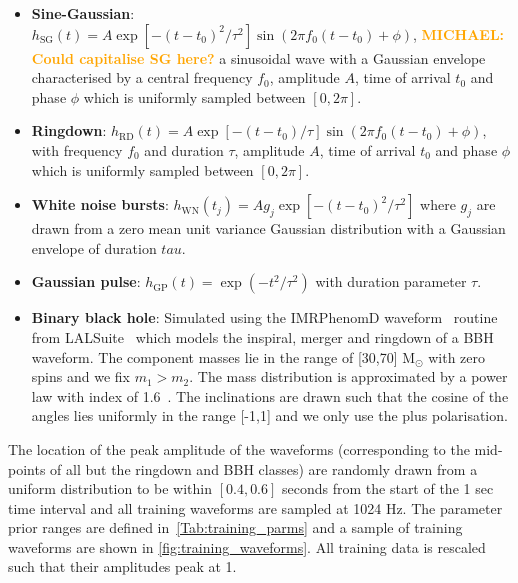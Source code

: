 \documentclass[12pt]{iopart}
\newcommand{\michael}[1]{\textbf{\textcolor{orange}{MICHAEL: #1}}}
\begin{document}
%
\begin{itemize}
%
\item {\bf Sine-Gaussian}: $h_{\text{SG}}(t) = A \exp\left[ - (t-t_{0})^2 /
\tau^2 \right] \sin (2 \pi f_0 (t-t_0) + \phi)$, \michael{Could capitalise SG here?} a sinusoidal wave with a Gaussian
envelope characterised by a central frequency $f_0$, amplitude $A$, time of arrival $t_{0}$ and phase $\phi$ which is uniformly sampled between $[0, 2\pi]$.
%
\item {\bf Ringdown}: $h_{\text{RD}}(t) = A \exp \left[-{(t-t_0)} / {\tau}
\right] \sin(2 \pi f_0 (t-t_0) + \phi)$, with frequency $f_0$ and duration $\tau$, amplitude $A$, time of arrival $t_{0}$ and phase $\phi$ which is uniformly sampled between $[0, 2\pi]$. 
%
\item {\bf White noise bursts}: $h_{\text{WN}}(t_j) = Ag_j\exp\left[ -
(t-t_{0})^2 / \tau^2 \right]$ where $g_j$ are drawn from a zero mean unit
variance Gaussian distribution with a Gaussian envelope of duration $tau$.
%
\item {\bf Gaussian pulse}: $h_{\text{GP}}(t) = \exp(-t^2 / \tau^2)$ with
duration parameter $\tau$.
%
\item {\bf Binary black hole}: Simulated using the IMRPhenomD
waveform~\cite{Khan_2016} routine from LALSuite~\cite{lalsuite} which models
the inspiral, merger and ringdown of a \ac{BBH} waveform. The component masses
lie in the range of [30,70] $\textrm{M}_{\odot}$ with zero spins and we fix
$m_1>m_2$. The mass distribution is approximated by a power law with
index of 1.6~\cite{Abbott_2019}. The inclinations are drawn
such that the cosine of the angles lies uniformly in the range [-1,1] and we only use the plus polarisation.
%
\end{itemize}
%
The location of the peak amplitude of the waveforms (corresponding to the
mid-points of all but the ringdown and \ac{BBH} classes) are randomly drawn from a uniform distribution to
be within $[0.4, 0.6]$ seconds from the start of the 1 sec time interval and all
training waveforms are sampled at 1024 Hz.  The parameter prior ranges are
defined in~\cref{Tab:training_parms} and a sample of training waveforms are shown in \cref{fig:training_waveforms}. All training data is rescaled such that their amplitudes peak at 1.
\end{document}
